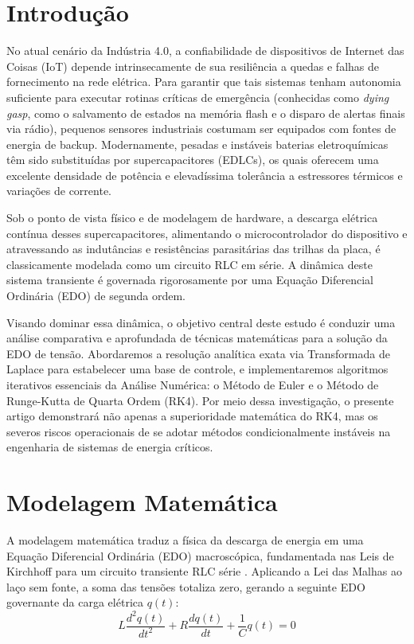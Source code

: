 \documentclass[11pt, a4paper]{article}
\begin{document}
\vspace{0.1cm}


\section{Introdução}
No atual cenário da Indústria 4.0, a confiabilidade de dispositivos de Internet das Coisas (IoT) depende intrinsecamente de sua resiliência a quedas e falhas de fornecimento na rede elétrica. Para garantir que tais sistemas tenham autonomia suficiente para executar rotinas críticas de emergência (conhecidas como \textit{dying gasp}, como o salvamento de estados na memória flash e o disparo de alertas finais via rádio), pequenos sensores industriais costumam ser equipados com fontes de energia de backup. Modernamente, pesadas e instáveis baterias eletroquímicas têm sido substituídas por supercapacitores (EDLCs), os quais oferecem uma excelente densidade de potência e elevadíssima tolerância a estressores térmicos e variações de corrente.

Sob o ponto de vista físico e de modelagem de hardware, a descarga elétrica contínua desses supercapacitores, alimentando o microcontrolador do dispositivo e atravessando as indutâncias e resistências parasitárias das trilhas da placa, é classicamente modelada como um circuito RLC em série. A dinâmica deste sistema transiente é governada rigorosamente por uma Equação Diferencial Ordinária (EDO) de segunda ordem. 

Visando dominar essa dinâmica, o objetivo central deste estudo é conduzir uma análise comparativa e aprofundada de técnicas matemáticas para a solução da EDO de tensão. Abordaremos a resolução analítica exata via Transformada de Laplace para estabelecer uma base de controle, e implementaremos algoritmos iterativos essenciais da Análise Numérica: o Método de Euler e o Método de Runge-Kutta de Quarta Ordem (RK4). Por meio dessa investigação, o presente artigo demonstrará não apenas a superioridade matemática do RK4, mas os severos riscos operacionais de se adotar métodos condicionalmente instáveis na engenharia de sistemas de energia críticos.

\section{Modelagem Matemática}

A modelagem matemática traduz a física da descarga de energia em uma Equação Diferencial Ordinária (EDO) macroscópica, fundamentada nas Leis de Kirchhoff para um circuito transiente RLC série \cite{kafle2025, shaikh2022}. Aplicando a Lei das Malhas ao laço sem fonte, a soma das tensões totaliza zero, gerando a seguinte EDO governante da carga elétrica $q(t)$:
\begin{equation}
    L \frac{d^2q(t)}{dt^2} + R \frac{dq(t)}{dt} + \frac{1}{C} q(t) = 0
\end{equation}
\end{document}
